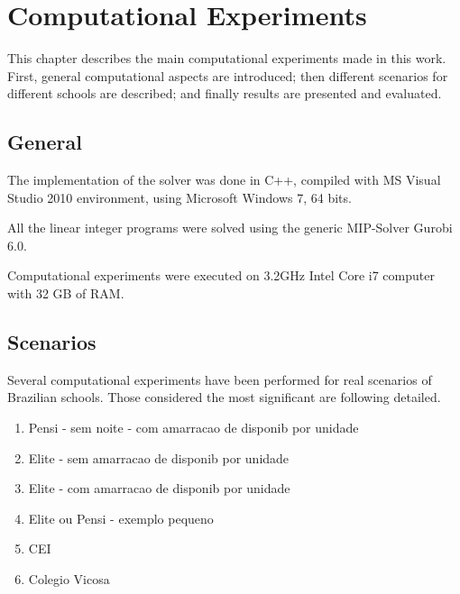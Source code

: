 \chapter{Computational Experiments}
\label{chap:experiments}


This chapter describes the main computational experiments made in this work. First, general computational aspects are introduced; then different scenarios for different schools are described; and finally results are presented and evaluated.


\section{General}

The implementation of the solver was done in C++, compiled with MS Visual Studio 2010 environment, using Microsoft Windows 7, 64 bits.

All the linear integer programs were solved using the generic MIP-Solver Gurobi 6.0. 

Computational experiments were executed on 3.2GHz  Intel Core i7 computer with 32 GB of RAM.


\section{Scenarios}

Several computational experiments have been performed for real scenarios of Brazilian schools. Those considered the most significant are following detailed.

\begin{enumerate}
\item Pensi - sem noite - com amarracao de disponib por unidade

\item Elite - sem amarracao de disponib por unidade

\item Elite - com amarracao de disponib por unidade

\item Elite ou Pensi - exemplo pequeno

\item CEI

\item Colegio Vicosa

\end{enumerate}


